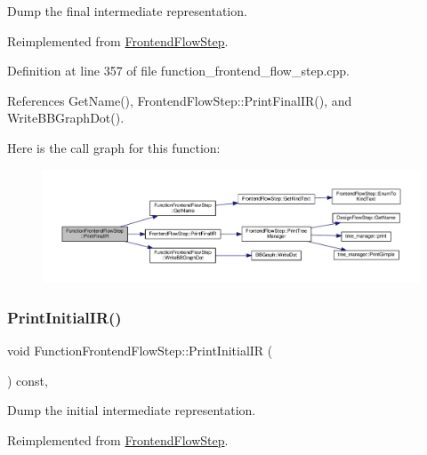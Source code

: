 Dump the final intermediate representation. 



Reimplemented from \hyperlink{classFrontendFlowStep_a2a9b475fe6e3739803cb4e6afdc94a01}{Frontend\+Flow\+Step}.



Definition at line 357 of file function\+\_\+frontend\+\_\+flow\+\_\+step.\+cpp.



References Get\+Name(), Frontend\+Flow\+Step\+::\+Print\+Final\+I\+R(), and Write\+B\+B\+Graph\+Dot().

Here is the call graph for this function\+:
\nopagebreak
\begin{figure}[H]
\begin{center}
\leavevmode
\includegraphics[width=350pt]{d8/d0a/classFunctionFrontendFlowStep_abe2dc98fddb94bebf12a91e8c78f9dcc_cgraph}
\end{center}
\end{figure}
\mbox{\label{classFunctionFrontendFlowStep_a65cf8273a7a4f4bc3ed85c04220349ad}} 
\subsubsection{\texorpdfstring{Print\+Initial\+I\+R()}{PrintInitialIR()}}
{\footnotesize\ttfamily void Function\+Frontend\+Flow\+Step\+::\+Print\+Initial\+IR (\begin{DoxyParamCaption}{ }\end{DoxyParamCaption}) const\hspace{0.3cm}{\ttfamily [override]}, {\ttfamily [virtual]}}



Dump the initial intermediate representation. 



Reimplemented from \hyperlink{classFrontendFlowStep_aa4082589c5838cc22e2b4ea7097b5c16}{Frontend\+Flow\+Step}.




